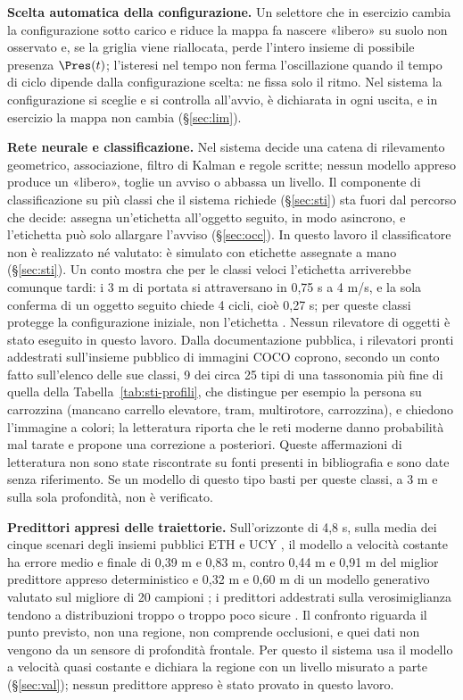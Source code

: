 \textbf{Scelta automatica della configurazione.} Un selettore che in esercizio cambia la configurazione sotto carico e riduce la mappa fa nascere «libero» su suolo non osservato e, se la griglia viene riallocata, perde l'intero insieme di possibile presenza $\Pres(t)$; l'isteresi nel tempo non ferma l'oscillazione quando il tempo di ciclo dipende dalla configurazione scelta: ne fissa solo il ritmo. Nel sistema la configurazione si sceglie e si controlla all'avvio, è dichiarata in ogni uscita, e in esercizio la mappa non cambia (\S\ref{sec:lim}). 

\textbf{Rete neurale e classificazione.} Nel sistema decide una catena di rilevamento geometrico, associazione, filtro di Kalman e regole scritte; nessun modello appreso produce un «libero», toglie un avviso o abbassa un livello. Il componente di classificazione su più classi che il sistema richiede (\S\ref{sec:sti}) sta fuori dal percorso che decide: assegna un'etichetta all'oggetto seguito, in modo asincrono, e l'etichetta può solo allargare l'avviso (\S\ref{sec:occ}). In questo lavoro il classificatore non è realizzato né valutato: è simulato con etichette assegnate a mano (\S\ref{sec:sti}). Un conto mostra che per le classi veloci l'etichetta arriverebbe comunque tardi: i 3 m di portata si attraversano in 0,75 s a 4 m/s, e la sola conferma di un oggetto seguito chiede 4 cicli, cioè 0,27 s; per queste classi protegge la configurazione iniziale, non l'etichetta . Nessun rilevatore di oggetti è stato eseguito in questo lavoro. Dalla documentazione pubblica, i rilevatori pronti addestrati sull'insieme pubblico di immagini COCO coprono, secondo un conto fatto sull'elenco delle sue classi, 9 dei circa 25 tipi di una tassonomia più fine di quella della Tabella~\ref{tab:sti-profili}, che distingue per esempio la persona su carrozzina (mancano carrello elevatore, tram, multirotore, carrozzina), e chiedono l'immagine a colori; la letteratura riporta che le reti moderne danno probabilità mal tarate e propone una correzione a posteriori. Queste affermazioni di letteratura non sono state riscontrate su fonti presenti in bibliografia e sono date senza riferimento. Se un modello di questo tipo basti per queste classi, a 3 m e sulla sola profondità, non è verificato. 

\textbf{Predittori appresi delle traiettorie.} Sull'orizzonte di 4,8 s, sulla media dei cinque scenari degli insiemi pubblici ETH e UCY \cite{pellegrini2009,lerner2007}, il modello a velocità costante ha errore medio e finale di 0,39 m e 0,83 m, contro 0,44 m e 0,91 m del miglior predittore appreso deterministico e 0,32 m e 0,60 m di un modello generativo valutato sul migliore di 20 campioni \cite{scholler2020}; i predittori addestrati sulla verosimiglianza tendono a distribuzioni troppo o troppo poco sicure \cite{cheraghipouria2026}. Il confronto riguarda il punto previsto, non una regione, non comprende occlusioni, e quei dati non vengono da un sensore di profondità frontale. Per questo il sistema usa il modello a velocità quasi costante e dichiara la regione con un livello misurato a parte (\S\ref{sec:val}); nessun predittore appreso è stato provato in questo lavoro.

